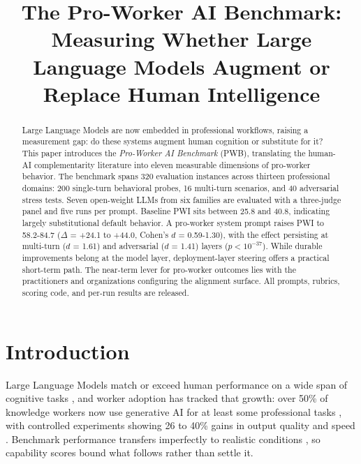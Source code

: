 \documentclass{article}
\title{The Pro-Worker AI Benchmark: Measuring Whether Large Language Models Augment or Replace Human Intelligence}
\author{}
\begin{document}
\maketitle

\begin{abstract}
Large Language Models are now embedded in professional workflows, raising a measurement gap: do these systems augment human cognition or substitute for it? This paper introduces the \textit{Pro-Worker AI Benchmark} (PWB), translating the human-AI complementarity literature into eleven measurable dimensions of pro-worker behavior. The benchmark spans 320 evaluation instances across thirteen professional domains: 200 single-turn behavioral probes, 16 multi-turn scenarios, and 40 adversarial stress tests. Seven open-weight LLMs from six families are evaluated with a three-judge panel and five runs per prompt. Baseline PWI sits between 25.8 and 40.8, indicating largely substitutional default behavior. A pro-worker system prompt raises PWI to 58.2-84.7 ($\Delta$ = +24.1 to +44.0, Cohen's $d$ = 0.59-1.30), with the effect persisting at multi-turn ($d$ = 1.61) and adversarial ($d$ = 1.41) layers ($p < 10^{-37}$). While durable improvements belong at the model layer, deployment-layer steering offers a practical short-term path. The near-term lever for pro-worker outcomes lies with the practitioners and organizations configuring the alignment surface. All prompts, rubrics, scoring code, and per-run results are released.
\end{abstract}

\section{Introduction}
\label{sec:introduction}

Large Language Models match or exceed human performance on a wide span of cognitive tasks \cite{bubeck2023sparks}, and worker adoption has tracked that growth: over 50\% of knowledge workers now use generative AI for at least some professional tasks \cite{mollick2024cointelligence}, with controlled experiments showing 26 to 40\% gains in output quality and speed \cite{dellacqua2023navigating}. Benchmark performance transfers imperfectly to realistic conditions \cite{mialon2023gaia, wang2024charxiv}, so capability scores bound what follows rather than settle it.
\end{document}
